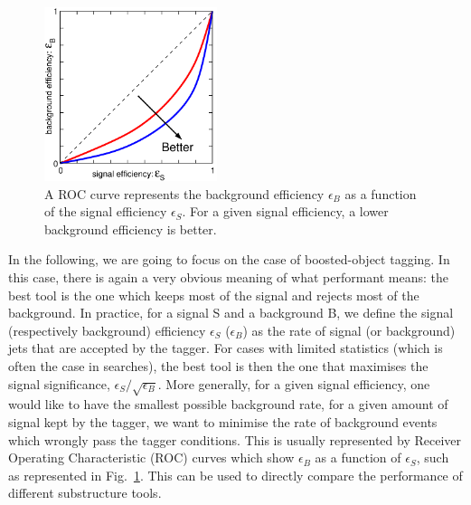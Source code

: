\begin{figure}
  \centerline{\includegraphics[width=0.45\textwidth]{figures/sketch-roc.pdf}}
  \caption{A ROC curve represents the background efficiency
    $\epsilon_B$ as a function of the signal efficiency
    $\epsilon_S$. For a given signal efficiency, a lower background
    efficiency is better.}\label{fig:ROC-sketch}
\end{figure}

In the following, we are going to focus on
the case of boosted-object tagging.
%
In this case, there is again a very obvious meaning of what performant
means: the best tool is the one which keeps most of the signal and
rejects most of the background.
%
In practice, for a signal S and a background B, we define the signal
(respectively background) efficiency $\epsilon_S$ ($\epsilon_B$) as
the rate of signal (or background) jets that are accepted by the
tagger. For cases with limited statistics (which is often the case in
searches), the best tool is then the one that maximises the signal
significance, $\epsilon_S/\sqrt{\epsilon_B}$. More generally, for a
given signal efficiency, one would like to have the smallest possible
background rate, \ie for a given amount of signal kept by the tagger,
we want to minimise the rate of background events which wrongly pass
the tagger conditions.
% 
This is usually represented by Receiver Operating Characteristic (ROC)
curves which show $\epsilon_B$ as a function of $\epsilon_S$, such as
represented in Fig.~\ref{fig:ROC-sketch}.
%
This can be used to directly compare the performance of different
substructure tools.

